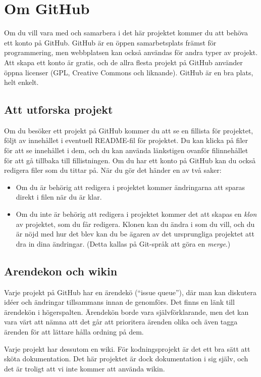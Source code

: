 \section{Om GitHub}

Om du vill vara med och samarbera i det här projektet kommer du att behöva ett konto på GitHub.
GitHub är en öppen samarbetsplats främst för programmering, men webbplatsen kan också användas för andra typer av projekt.
Att skapa ett konto är gratis, och de allra flesta projekt på GitHub använder öppna licenser (GPL, Creative Commons och liknande).
GitHub är en bra plats, helt enkelt.


\subsection{Att utforska projekt}

Om du besöker ett projekt på GitHub kommer du att se en fillista för projektet, följt av innehållet i eventuell README-fil för projektet.
Du kan klicka på filer för att se innehållet i dem, och du kan använda länkstigen ovanför filinnehållet för att gå tillbaka till fillistningen.
Om du har ett konto på GitHub kan du också redigera filer som du tittar på.
När du gör det händer en av två saker:

\begin{itemize}

\item Om du är behörig att redigera i projektet kommer ändringarna att sparas direkt i filen när du är klar.
\item Om du inte är behörig att redigera i projektet kommer det att skapas en \emph{klon} av projektet, som du får redigera.
Klonen kan du ändra i som du vill, och du är nöjd med hur det blev kan du be ägaren av det ursprungliga projektet att dra in dina ändringar.
(Detta kallas på Git-språk att göra en \emph{merge}.)

\end{itemize}


\subsection{Arendekon och wikin}

Varje projekt på GitHub har en ärendekö (``issue queue''), där man kan diskutera idéer och ändringar tillsammans innan de genomförs.
Det finns en länk till ärendekön i högerspalten.
Ärendekön borde vara självförklarande, men det kan vara värt att nämna att det går att prioritera ärenden olika och även tagga ärenden för att lättare hålla ordning på dem.

Varje projekt har dessutom en wiki. För kodningsprojekt är det ett bra sätt att sköta dokumentation.
Det här projektet är dock dokumentation i sig själv, och det är troligt att vi inte kommer att använda wikin.
